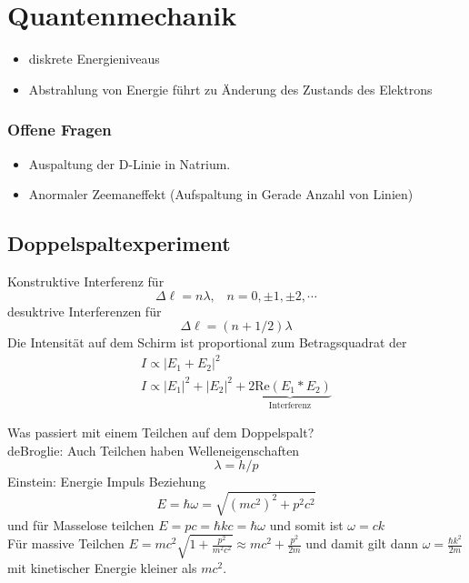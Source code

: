 \documentclass[]{scrbook}
\begin{document}
\chapter{Quantenmechanik}
\begin{itemize}
	\item diskrete Energieniveaus
	\item Abstrahlung von Energie führt zu Änderung des Zustands des Elektrons 
\end{itemize}
\subsection*{Offene Fragen}
\begin{itemize}
	\item Auspaltung der D-Linie in Natrium.
	\item Anormaler Zeemaneffekt (Aufspaltung in Gerade Anzahl von Linien)
\end{itemize}

\section{Doppelspaltexperiment}

Konstruktive Interferenz für
$$
\Delta \ell = n\lambda, \;\;\; n = 0, \pm1, \pm2,\cdots
$$
desuktrive Interferenzen für
$$
\Delta \ell = (n+1/2)\lambda
$$
Die Intensität auf dem Schirm ist proportional zum Betragsquadrat der
\begin{gather}
	I \propto |E_1 + E_2|^2\\
	I \propto |E_1|^2 + |E_2|^2 + \underbrace{2\text{Re}(E_1* E_2)}_{\text{Interferenz}}
\end{gather}

Was passiert mit einem Teilchen auf dem Doppelspalt?\\
deBroglie: Auch Teilchen haben Welleneigenschaften
$$
\lambda = h/p
$$
Einstein: Energie Impuls Beziehung
$$
E = \hbar\omega = \sqrt{(mc^2)^2 + p^2c^2}
$$
und für Masselose teilchen $E=pc = \hbar kc = \hbar\omega$ und somit ist $\omega = ck$\\
Für massive Teilchen $E = mc^2 \sqrt{1 + \frac{p^2}{m^2c^2}} \approx mc^2 + \frac{p^2}{2m}$ und damit gilt dann $\omega = \frac{\hbar k^2}{2m}$ mit kinetischer Energie kleiner als $mc^2$.
\end{document}
